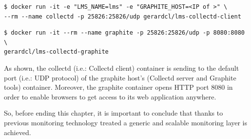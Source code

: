 \begin{verbatim}
$ docker run -it -e "LMS_NAME=lms" -e "GRAPHITE_HOST=<IP of >" \
--rm --name collectd -p 25826:25826/udp gerardcl/lms-collectd-client
\end{verbatim}

\begin{verbatim}
$ docker run -it --rm --name graphite -p 25826:25826/udp -p 8080:8080 \
gerardcl/lms-collectd-graphite
\end{verbatim}

As shown, the collectd (i.e.: Collectd client) container is sending to the default port (i.e.: UDP protocol) of the graphite host's (Collectd server and Graphite tools) container. Moreover, the graphite container opens HTTP port 8080 in order to enable browsers to get access to its web application anywhere. 

So, before ending this chapter, it is important to conclude that thanks to previous monitoring technology treated a generic and scalable monitoring layer is achieved.